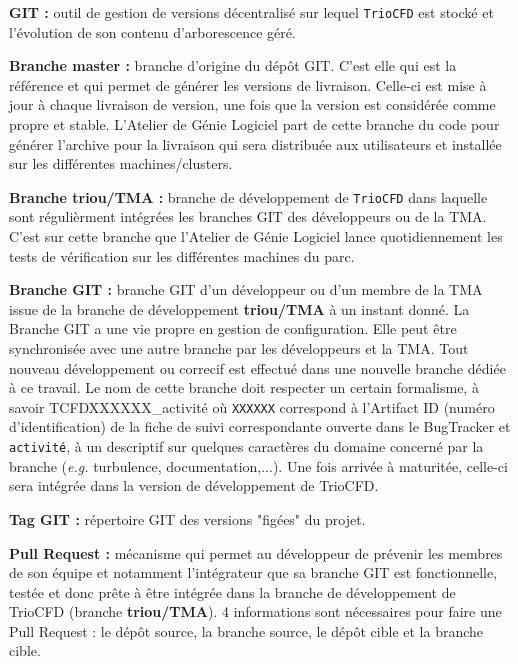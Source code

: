 \textbf{GIT :} outil de gestion de versions d\'ecentralis\'e sur lequel \texttt{TrioCFD} est stock\'e et l'\'evolution de son contenu d'arborescence g\'er\'e.\smallskip\newline

\textbf{Branche master :} branche d'origine du d\'ep\^ot GIT. C'est elle qui est la r\'ef\'erence et qui permet de g\'en\'erer les versions de livraison. Celle-ci est mise \`a jour \`a chaque livraison de version, une fois que la version est consid\'er\'ee comme propre et stable. L'Atelier de G\'enie Logiciel part de cette branche du 
code pour g\'en\'erer l'archive pour la livraison qui sera distribu\'ee aux utilisateurs et install\'ee sur les diff\'erentes machines/clusters.\smallskip\newpage

\textbf{Branche triou/TMA :} branche de d\'eveloppement de \texttt{TrioCFD} dans laquelle sont r\'eguli\`erment int\'egr\'ees les branches GIT des d\'eveloppeurs ou de la TMA. C'est sur cette branche que l'Atelier de G\'enie Logiciel lance quotidiennement les tests de v\'erification sur les diff\'erentes machines du parc.\smallskip\newline

\textbf{Branche GIT :} branche GIT d'un d\'eveloppeur ou d'un membre de la TMA issue de la branche de d\'eveloppement \textbf{triou/TMA} \`a un instant donn\'e. La Branche GIT a une vie propre en gestion de configuration. Elle peut \^etre synchronis\'ee avec une autre branche par les d\'eveloppeurs et la TMA. Tout nouveau d\'eveloppement ou correcif est effectu\'e dans une nouvelle branche d\'edi\'ee \`a ce travail. Le nom de cette branche doit respecter un certain formalisme, \`a savoir TCFDXXXXXX\_activit\'e o\`u \texttt{XXXXXX} correspond \`a l'Artifact ID (numéro d'identification) de la fiche de suivi correspondante ouverte dans le BugTracker et \texttt{activit\'e}, \`a un descriptif sur quelques caract\`eres du domaine concern\'e par la branche (\textit{e.g.} turbulence, documentation,...). Une fois arriv\'ee \`a maturit\'ee, celle-ci sera int\'egr\'ee dans la version de d\'eveloppement de TrioCFD.\smallskip\newline

\textbf{Tag GIT :} r\'epertoire GIT des versions "fig\'ees" du projet.\smallskip\newline

\textbf{Pull Request :} m\'ecanisme qui permet au d\'eveloppeur de pr\'evenir les membres de son \'equipe et notamment l'int\'egrateur que sa branche GIT  est fonctionnelle, test\'ee et donc pr\^ete \`a \^etre int\'egr\'ee dans la branche de d\'eveloppement de TrioCFD (branche \textbf{triou/TMA}). 4 informations sont n\'ecessaires pour faire une Pull Request : le d\'ep\^ot source, la branche source, le d\'ep\^ot cible et la branche cible. \smallskip\newline\newline

